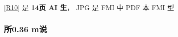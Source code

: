 \documentclass[11pt,a4paper]{article}
\numberwithin{equation}{section}
\numberwithin{figure}{section}
\begin{document}
\hyperlink{ref-R10}{[R10]} {\cjkfont 是}\allowbreak{} \textbf{14{\cjkfont 页}\allowbreak{} AI {\cjkfont 生}\allowbreak{}}{\cjkfont ，}\allowbreak{} JPG {\cjkfont 是}\allowbreak{} FMI {\cjkfont 中}\allowbreak{} PDF {\cjkfont 本}\allowbreak{} FMI {\cjkfont 型}\allowbreak{}

\subsubsection{{\cjkfont 所}\allowbreak{}0.36 m{\cjkfont 说}\allowbreak{}}
\end{document}

